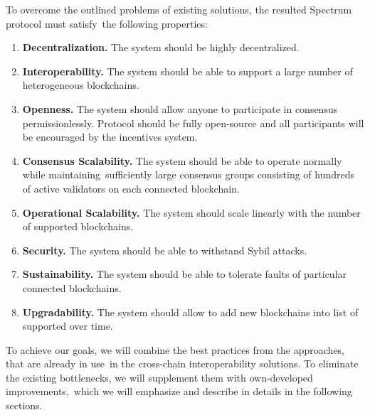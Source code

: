 To overcome the outlined problems of existing solutions, the resulted Spectrum protocol must satisfy\
the following properties:

\begin{enumerate}
    \item \textbf{Decentralization.} The system should be highly decentralized.
    \item \textbf{Interoperability.} The system should be able to support a large number of heterogeneous blockchains.
    \item \textbf{Openness.} The system should allow anyone to participate in consensus permissionlessly.
    Protocol should be fully open-source and all participants will be encouraged by the incentives system.
    \item \textbf{Consensus Scalability.} The system should be able to operate normally while maintaining\
    sufficiently large consensus groups consisting of hundreds of active validators on each connected blockchain.
    \item \textbf{Operational Scalability.} The system should scale linearly with the number of supported blockchains.
    \item \textbf{Security.} The system should be able to withstand Sybil attacks.
    \item \textbf{Sustainability.} The system should be able to tolerate faults of particular connected blockchains.
    \item \textbf{Upgradability.} The system should allow to add new blockchains into list of supported over time.
\end{enumerate}

To achieve our goals, we will combine the best practices from the approaches, that are already in use\
in the cross-chain interoperability solutions.
To eliminate the existing bottlenecks, we will supplement them with own-developed improvements,\
which we will emphasize and describe in details in the following sections.